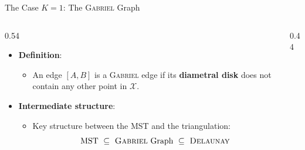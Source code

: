\documentclass[A4,svgnames,9pt,aspectratio=169]{beamer}
\begin{document}
\begin{frame}{The Case $K=1$: The \textsc{Gabriel} Graph}
    \begin{columns}[c, onlytextwidth]
        \begin{column}{0.54\textwidth}
            \begin{itemize}
                \setlength{\itemsep}{10pt}
                \item \textbf{Definition}:
                \begin{itemize}
                    \item An edge $[A, B]$ is a \textsc{Gabriel} edge if its \textbf{diametral disk} does not contain any other point in $\mathcal{X}$.
                \end{itemize}
                \item \textbf{Intermediate structure}:
                \begin{itemize}
                    \item Key structure between the MST and the triangulation:
                    \[ \text{MST} \ \subseteq \ \text{\textsc{Gabriel} Graph} \ \subseteq \ \text{\textsc{Delaunay}} \]
                \end{itemize}
            \end{itemize}
        \end{column}
        
        \begin{column}{0.44\textwidth}
            \begin{center}
\end{center}
\end{column}
\end{columns}
\end{frame}
\end{document}
